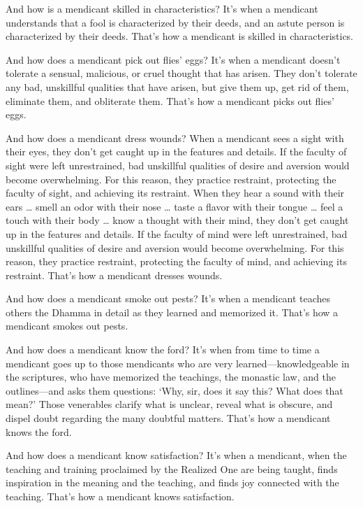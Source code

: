 \documentclass[12pt,openany]{book}%
\begin{document}
And how is a mendicant skilled in characteristics? It’s when a mendicant understands that a fool is characterized by their deeds, and an astute person is characterized by their deeds. That’s how a mendicant is skilled in characteristics. 

And how does a mendicant pick out flies’ eggs? It’s when a mendicant doesn’t tolerate a sensual, malicious, or cruel thought that has arisen. They don’t tolerate any bad, unskillful qualities that have arisen, but give them up, get rid of them, eliminate them, and obliterate them. That’s how a mendicant picks out flies’ eggs. 

And how does a mendicant dress wounds? When a mendicant sees a sight with their eyes, they don’t get caught up in the features and details. If the faculty of sight were left unrestrained, bad unskillful qualities of desire and aversion would become overwhelming. For this reason, they practice restraint, protecting the faculty of sight, and achieving its restraint. When they hear a sound with their ears … smell an odor with their nose … taste a flavor with their tongue … feel a touch with their body … know a thought with their mind, they don’t get caught up in the features and details. If the faculty of mind were left unrestrained, bad unskillful qualities of desire and aversion would become overwhelming. For this reason, they practice restraint, protecting the faculty of mind, and achieving its restraint. That’s how a mendicant dresses wounds. 

And how does a mendicant smoke out pests? It’s when a mendicant teaches others the Dhamma in detail as they learned and memorized it. That’s how a mendicant smokes out pests. 

And how does a mendicant know the ford? It’s when from time to time a mendicant goes up to those mendicants who are very learned—knowledgeable in the scriptures, who have memorized the teachings, the monastic law, and the outlines—and asks them questions: ‘Why, sir, does it say this? What does that mean?’ Those venerables clarify what is unclear, reveal what is obscure, and dispel doubt regarding the many doubtful matters. That’s how a mendicant knows the ford. 

And how does a mendicant know satisfaction? It’s when a mendicant, when the teaching and training proclaimed by the Realized One are being taught, finds inspiration in the meaning and the teaching, and finds joy connected with the teaching. That’s how a mendicant knows satisfaction. 
\end{document}
